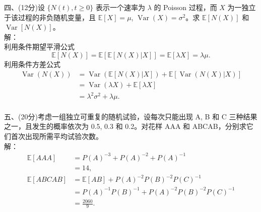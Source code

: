 \documentclass[UTF8]{ctexart}
\begin{document}
\noindent 四、(12分)设 $\{N(t), t \geq 0\}$ 表示一个速率为 $\lambda$ 的 Poisson 过程，而 $X$ 为一独立于该过程的非负随机变量，且 $\mathbb{E}[X] = \mu$, $\operatorname{Var}(X) = \sigma^2$。求 $\mathbb{E}[N(X)]$ 和 $\operatorname{Var}[N(X)]$。\\
解：\\
利用条件期望平滑公式
$$
\mathbb{E}[N(X)]=\mathbb{E}[\mathbb{E}[N(X)|X]]=\mathbb{E}[\lambda X]=\lambda\mu.
$$
利用条件方差公式
$$
\begin{aligned}
	\operatorname{Var}(N(X))&=\operatorname{Var}(\mathbb{E}[N(X)|X])+\mathbb{E}[\operatorname{Var}(N(X)|X)]\\
	&=\operatorname{Var}(\lambda X)+\mathbb{E}[\lambda X]\\
	&=\lambda^2\sigma^2+\lambda\mu.
\end{aligned}
$$\\


\noindent 五、(20分)考虑一组独立可重复的随机试验，设每次只能出现 A, B 和 C 三种结果之一，且发生的概率依次为 0.5, 0.3 和 0.2。对花样 AAA 和 ABCAB，分别求它们首次出现所需平均试验次数。\\
解：\\
\begin{align*}
	\mathbb{E}[AAA]&=P(A)^{-3}+P(A)^{-2}+P(A)^{-1}\\
	&=14,\\
	\mathbb{E}[ABCAB]&=\mathbb{E}[AB]+P(A)^{-2}P(B)^{-2}P(C)^{-1}\\  &=P(A)^{-1}P(B)^{-1}+P(A)^{-2}P(B)^{-2}P(C)^{-1}\\
	&=\frac{2060}{9}.
\end{align*}\\
\end{document}

